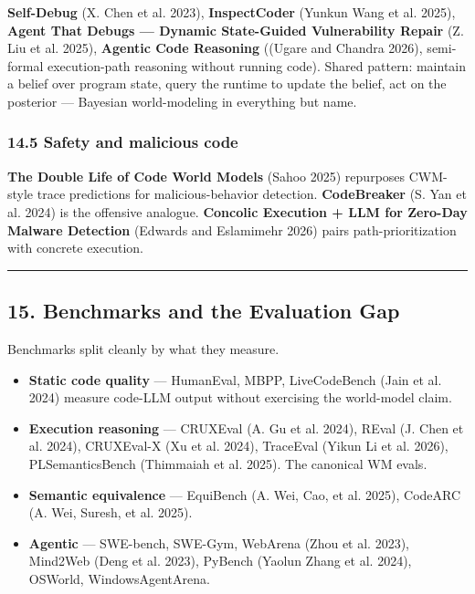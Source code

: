 \documentclass{article}
\providecommand{\tightlist}{\setlength{\itemsep}{0pt}\setlength{\parskip}{0pt}}
\begin{document}
\textbf{Self-Debug} (X. Chen et al. 2023), \textbf{InspectCoder} (Yunkun
Wang et al. 2025), \textbf{Agent That Debugs --- Dynamic State-Guided
Vulnerability Repair} (Z. Liu et al. 2025), \textbf{Agentic Code
Reasoning} ((Ugare and Chandra 2026), semi-formal execution-path
reasoning without running code). Shared pattern: maintain a belief over
program state, query the runtime to update the belief, act on the
posterior --- Bayesian world-modeling in everything but name.

\hypertarget{safety-and-malicious-code}{%
\subsubsection{14.5 Safety and malicious
code}\label{safety-and-malicious-code}}

\textbf{The Double Life of Code World Models} (Sahoo 2025) repurposes
CWM-style trace predictions for malicious-behavior detection.
\textbf{CodeBreaker} (S. Yan et al. 2024) is the offensive analogue.
\textbf{Concolic Execution + LLM for Zero-Day Malware Detection}
(Edwards and Eslamimehr 2026) pairs path-prioritization with concrete
execution.

\begin{center}\rule{0.5\linewidth}{0.5pt}\end{center}

\hypertarget{benchmarks-and-the-evaluation-gap}{%
\subsection{15. Benchmarks and the Evaluation
Gap}\label{benchmarks-and-the-evaluation-gap}}

Benchmarks split cleanly by what they measure.

\begin{itemize}
\tightlist
\item
  \textbf{Static code quality} --- HumanEval, MBPP, LiveCodeBench (Jain
  et al. 2024) measure code-LLM output without exercising the
  world-model claim.
\item
  \textbf{Execution reasoning} --- CRUXEval (A. Gu et al. 2024), REval
  (J. Chen et al. 2024), CRUXEval-X (Xu et al. 2024), TraceEval (Yikun
  Li et al. 2026), PLSemanticsBench (Thimmaiah et al. 2025). The
  canonical WM evals.
\item
  \textbf{Semantic equivalence} --- EquiBench (A. Wei, Cao, et al.
  2025), CodeARC (A. Wei, Suresh, et al. 2025).
\item
  \textbf{Agentic} --- SWE-bench, SWE-Gym, WebArena (Zhou et al. 2023),
  Mind2Web (Deng et al. 2023), PyBench (Yaolun Zhang et al. 2024),
  OSWorld, WindowsAgentArena.
\end{itemize}
\end{document}
